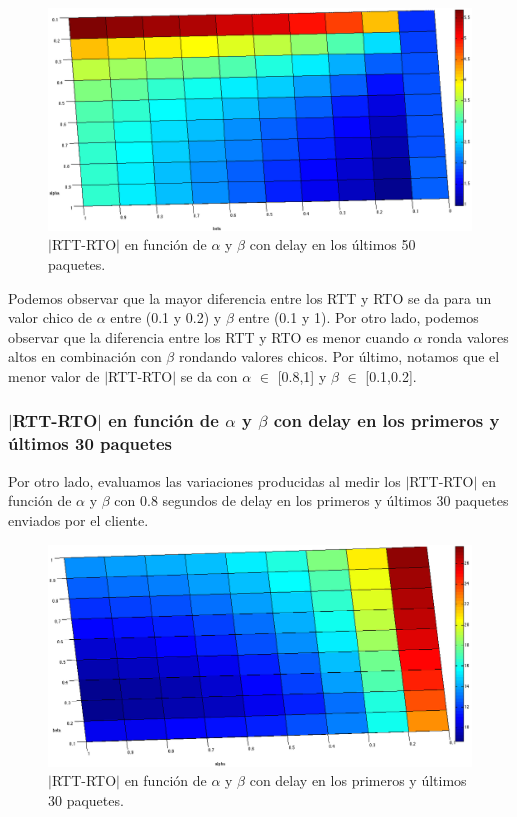 \documentclass[10pt, a4paper]{article}
\begin{document}
\begin{figure}[H]
\begin{center}
\includegraphics[width=17cm]{delay-50L-costado.png}
\caption{$|$RTT-RTO$|$ en función de $\alpha$ y $\beta$ con delay en los últimos 50 paquetes.}
\end{center}
\end{figure}

Podemos observar que la mayor diferencia entre los RTT y RTO se da para un valor chico de $\alpha$ entre (0.1 y 0.2) y $\beta$ entre (0.1 y 1).
Por otro lado, podemos observar que la diferencia entre los RTT y RTO es menor cuando $\alpha$ ronda valores altos en combinación con $\beta$ rondando valores chicos.
Por último, notamos que el menor valor de $|$RTT-RTO$|$ se da con $\alpha$ $\in$ [0.8,1] y $\beta$ $\in$ [0.1,0.2].

\subsubsection{$|$RTT-RTO$|$ en función de $\alpha$ y $\beta$ con delay en los primeros y últimos 30 paquetes}
Por otro lado, evaluamos las variaciones producidas al medir los $|$RTT-RTO$|$ en función de $\alpha$ y $\beta$ con 0.8 segundos de delay en los primeros y últimos 30 paquetes enviados por el cliente.

\begin{figure}[H]
\begin{center}
\includegraphics[width=17cm]{delay-30F30L-costado.png}
\caption{$|$RTT-RTO$|$ en función de $\alpha$ y $\beta$ con delay en los primeros y últimos 30 paquetes.}
\end{center}
\end{figure}
\end{document}
